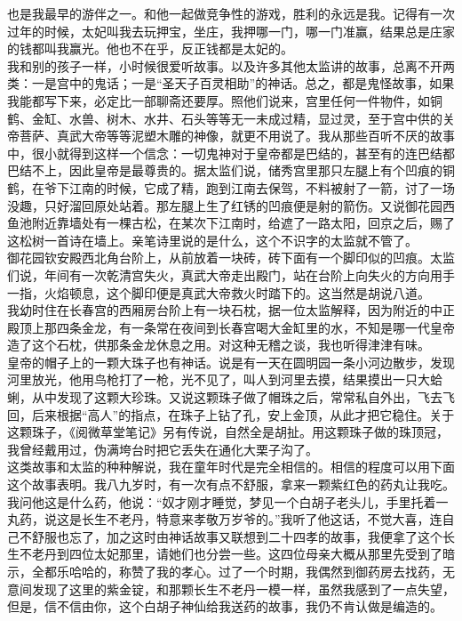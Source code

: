 也是我最早的游伴之一。和他一起做竞争性的游戏，胜利的永远是我。记得有一次过年的时候，太妃叫我去玩押宝，坐庄，我押哪一门，哪一门准赢，结果总是庄家的钱都叫我赢光。他也不在乎，反正钱都是太妃的。\\

我和别的孩子一样，小时候很爱听故事。以及许多其他太监讲的故事，总离不开两类：一是宫中的鬼话；一是“圣天子百灵相助”的神话。总之，都是鬼怪故事，如果我能都写下来，必定比一部聊斋还要厚。照他们说来，宫里任何一件物件，如铜鹤、金缸、水兽、树木、水井、石头等等无一未成过精，显过灵，至于宫中供的关帝菩萨、真武大帝等等泥塑木雕的神像，就更不用说了。我从那些百听不厌的故事中，很小就得到这样一个信念：一切鬼神对于皇帝都是巴结的，甚至有的连巴结都巴结不上，因此皇帝是最尊贵的。据太监们说，储秀宫里那只左腿上有个凹痕的铜鹤，在爷下江南的时候，它成了精，跑到江南去保驾，不料被射了一箭，讨了一场没趣，只好溜回原处站着。那左腿上生了红锈的凹痕便是射的箭伤。又说御花园西鱼池附近靠墙处有一棵古松，在某次下江南时，给遮了一路太阳，回京之后，赐了这松树一首诗在墙上。亲笔诗里说的是什么，这个不识字的太监就不管了。\\

御花园钦安殿西北角台阶上，从前放着一块砖，砖下面有一个脚印似的凹痕。太监们说，年间有一次乾清宫失火，真武大帝走出殿门，站在台阶上向失火的方向用手一指，火焰顿息，这个脚印便是真武大帝救火时踏下的。这当然是胡说八道。\\

我幼时住在长春宫的西厢房台阶上有一块石枕，据一位太监解释，因为附近的中正殿顶上那四条金龙，有一条常在夜间到长春宫喝大金缸里的水，不知是哪一代皇帝造了这个石枕，供那条金龙休息之用。对这种无稽之谈，我也听得津津有味。\\

皇帝的帽子上的一颗大珠子也有神话。说是有一天在圆明园一条小河边散步，发现河里放光，他用鸟枪打了一枪，光不见了，叫人到河里去摸，结果摸出一只大蛤蜊，从中发现了这颗大珍珠。又说这颗珠子做了帽珠之后，常常私自外出，飞去飞回，后来根据“高人”的指点，在珠子上钻了孔，安上金顶，从此才把它稳住。关于这颗珠子，《阅微草堂笔记》另有传说，自然全是胡扯。用这颗珠子做的珠顶冠，我曾经戴用过，伪满垮台时把它丢失在通化大栗子沟了。\\

这类故事和太监的种种解说，我在童年时代是完全相信的。相信的程度可以用下面这个故事表明。我八九岁时，有一次有点不舒服，拿来一颗紫红色的药丸让我吃。我问他这是什么药，他说：“奴才刚才睡觉，梦见一个白胡子老头儿，手里托着一丸药，说这是长生不老丹，特意来孝敬万岁爷的。”我听了他这话，不觉大喜，连自己不舒服也忘了，加之这时由神话故事又联想到二十四孝的故事，我便拿了这个长生不老丹到四位太妃那里，请她们也分尝一些。这四位母亲大概从那里先受到了暗示，全都乐哈哈的，称赞了我的孝心。过了一个时期，我偶然到御药房去找药，无意间发现了这里的紫金锭，和那颗长生不老丹一模一样，虽然我感到了一点失望，但是，信不信由你，这个白胡子神仙给我送药的故事，我仍不肯认做是编造的。\\

